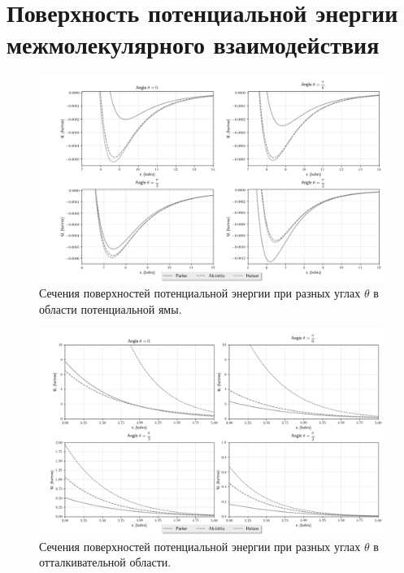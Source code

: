 \section{Поверхность потенциальной энергии межмолекулярного взаимодействия}

\begin{figure}[!ht]
	\hspace*{-1.2cm}
	\includegraphics[width=1.1\textwidth]{pictures/potential_well.png}
	\caption{Сечения поверхностей потенциальной энергии при разных углах $\theta$ в области потенциальной ямы.}
	\label{fig:pic1}
\end{figure}

\begin{figure}[!ht]
	\hspace*{-1.2cm}
	\includegraphics[width=1.1\textwidth]{pictures/potential_wall.png}
	\caption{Сечения поверхностей потенциальной энергии при разных углах $\theta$ в отталкивательной области.}
	\label{fig:pic2}
\end{figure}

